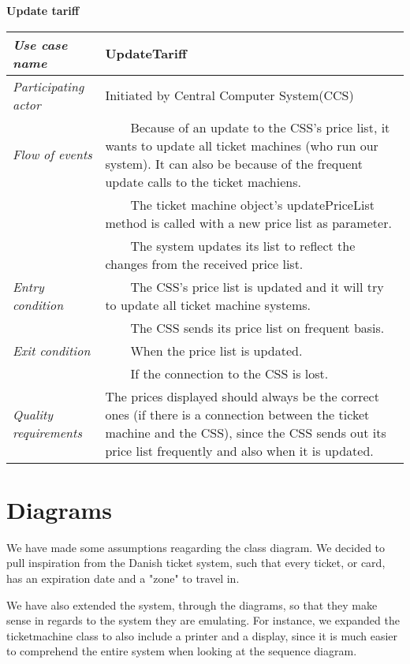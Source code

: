 \documentclass[10pt]{report}
\newcommand{\tabitem}{~~\llap{\textbullet}~~}
\numberwithin{equation}{section} %
\numberwithin{figure}{section} %
\numberwithin{table}{section} %
\begin{document}
\begin{table}[H]
\noindent \textbf{Update tariff}\\
\begin{tabularx}{\textwidth}{l X}
\midrule
\textit{Use case name} & UpdateTariff \\ \midrule
\textit{Participating actor} & Initiated by Central Computer System(CCS) \\ \midrule
\textit{Flow of events} & \tabitem Because of an update to the CSS's price list, it wants to update all ticket machines (who run our system). It can also be because of the frequent update calls to the ticket machiens.\\
						& \tabitem The ticket machine object's updatePriceList method is called with a new price list as parameter.\\
                        & \tabitem The system updates its list to reflect the changes from the received price list.\\
                        \midrule
\textit{Entry condition} & \tabitem The CSS's price list is updated and it will try to update all ticket machine systems.\\
                        & \tabitem The CSS sends its price list on frequent basis.\\
                        \midrule
\textit{Exit condition} & \tabitem When the price list is updated.\\
						& \tabitem If the connection to the CSS is lost.\\
                        \midrule
\textit{Quality requirements} & The prices displayed should always be the correct ones (if there is a connection between the ticket machine and the CSS), since the CSS sends out its price list frequently and also when it is updated.\\ \midrule
\end{tabularx}
\end{table}

\newpage
\section{Diagrams}
We have made some assumptions reagarding the class diagram. We decided to pull inspiration from the Danish ticket system,
such that every ticket, or card, has an expiration date and a "zone" to travel in.

We have also extended the system, through the diagrams, so that they make sense in regards to the system they are emulating. For instance, we expanded the ticketmachine class to also include a printer and a display, since it is much easier to comprehend the entire system when looking at the sequence diagram.
\end{document}
